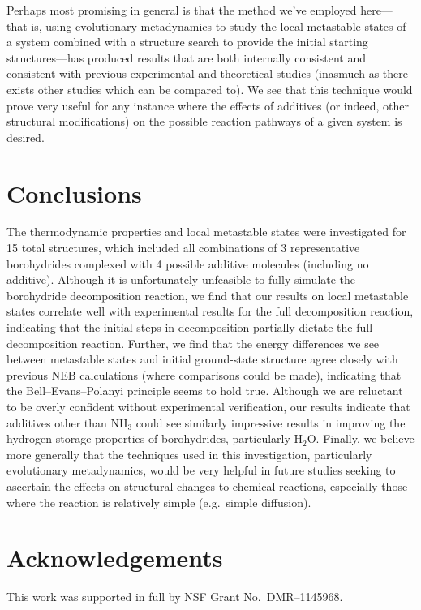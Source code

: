 \documentclass[twocolumn, prb, showpacs]{revtex4-1}
\begin{document}
Perhaps most promising in general is that the method we've employed here---
that is, using evolutionary metadynamics to study the local metastable
states of a system combined with a structure search to provide the initial
starting structures---has produced results that are both internally consistent
and consistent with previous experimental and theoretical studies (inasmuch as
there exists other studies which can be compared to). We see that this
technique would prove very useful for any instance where the effects
of additives (or indeed, other structural modifications) on the possible
reaction pathways of a given system is desired.


\section{Conclusions}


The thermodynamic properties and local metastable states were investigated
for 15 total structures, which included all combinations of 3 representative borohydrides
complexed with 4 possible additive molecules (including no additive). 
Although it is unfortunately unfeasible to fully simulate the borohydride decomposition reaction,
we find that our results on local metastable states correlate well with experimental results
for the full decomposition reaction, indicating that the initial steps in decomposition
partially dictate the full decomposition reaction. Further, we find that the energy
differences we see between metastable states and initial ground-state structure
agree closely with previous NEB calculations (where comparisons could be made),
indicating that the Bell--Evans--Polanyi principle seems to hold true.
Although we are reluctant to be overly confident without experimental verification,
our results indicate that additives other than NH$_3$ could see similarly
impressive results in improving the hydrogen-storage properties of borohydrides,
particularly H$_2$O. Finally, we believe more generally that the
techniques used in this investigation, particularly evolutionary metadynamics,
would be very helpful in future studies seeking to ascertain the effects
on structural changes to chemical reactions, especially those where the reaction
is relatively simple (e.g.\ simple diffusion).




\section*{Acknowledgements}
This work was supported in full by NSF Grant No.\ DMR--1145968.
\end{document}
